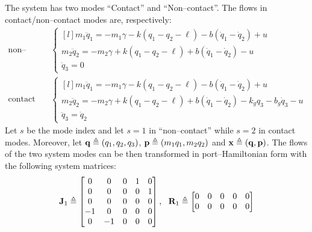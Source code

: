 \begin{exmp}
    The system has two modes ``Contact'' and ``Non--contact''. The flows in contact/non--contact modes are, respectively:
    \begin{align}
        \text{non--contact}\quad
        &\left\{
            \begin{matrix*}[l]
            m_1\ddot{q}_1 = -m_1\gamma -k\left(q_1-q_2-\ell\right) -b\left(\dot{q}_1-\dot{q}_2\right) + u\\
            m_2\ddot{q}_2 = -m_2\gamma +k\left(q_1-q_2-\ell\right) +b\left(\dot{q}_1-\dot{q}_2\right) - u\\
            \ddot{q}_3 = 0
            \end{matrix*}
        \right.\\
        \text{contact}\quad
        &\left\{
            \begin{matrix*}[l]
            m_1\ddot{q}_1 = -m_1\gamma -k\left(q_1-q_2-\ell\right) -b\left(\dot{q}_1-\dot{q}_2\right) + u\\
            m_2\ddot{q}_2 = -m_2\gamma +k\left(q_1-q_2-\ell\right) +b\left(\dot{q}_1-\dot{q}_2\right) - k_gq_3-b_g\dot{q}_3 - u\\
            \ddot{q}_3 = \dot{q}_2
            \end{matrix*}
        \right.
    \end{align}
    Let $s$ be the mode index and let $s=1$ in ``non--contact'' while $s=2$ in contact modes. Moreover, let $\mathbf{q} \triangleq (q_1,q_2,q_3)$, $\mathbf{p}\triangleq (m_1q_1,m_2q_2)$ and $\mathbf{x}\triangleq(\mathbf{q},\mathbf{p})$. The flows of the two system modes can be then transformed in port--Hamiltonian form with the following system matrices:
    \begin{equation}
        \mathbf{J}_1\triangleq
        \begin{bmatrix}
            0&0&0&1&0\\
            0&0&0&0&1\\
            0&0&0&0&0\\
            -1&0&0&0&0\\
            0&-1&0&0&0\\
        \end{bmatrix},~~
        \mathbf{R}_1\triangleq
        \begin{bmatrix}
            0&0&0&0&0\\
            0&0&0&0&0\\

\end{bmatrix}
\end{equation}
\end{exmp}
